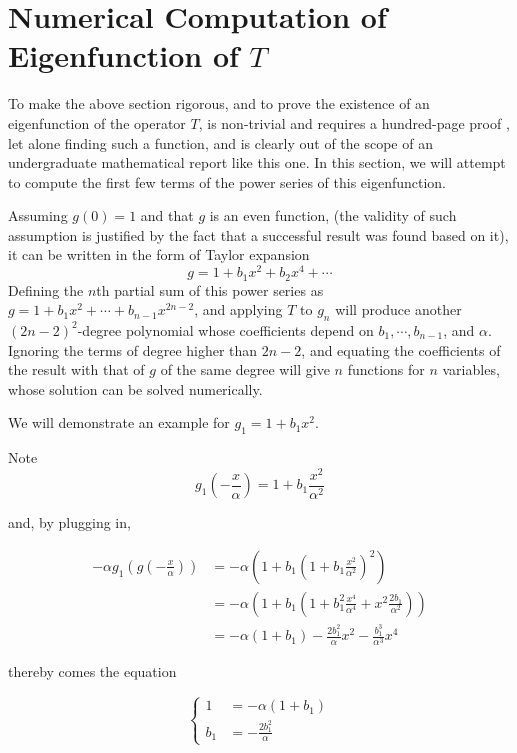 \section{Numerical Computation of Eigenfunction of $T$}

To make the above section rigorous, and to prove the existence of an eigenfunction of the operator $T$, is non-trivial and requires a hundred-page proof \cite{lyubich1999feigenbaum}, let alone finding such a function, and is clearly out of the scope of an undergraduate mathematical report like this one. 
In this section, we will attempt to compute the first few terms of the power series of this eigenfunction.

Assuming $g(0) = 1$ and that $g$ is an even function, (the validity of such assumption is justified by the fact that a successful result was found based on it), it can be written in the form of Taylor expansion 
$$
g = 1 + b_1 x^2 + b_2x^4 + \cdots 
$$
Defining the $n$th partial sum of this power series as $g = 1 + b_1x^2 + \cdots + b_{n-1}x^{2n-2}$, and applying $T$ to $g_n$ will produce another $(2n-2)^2$-degree polynomial whose coefficients depend on $b_1, \cdots, b_{n-1}$, and $\alpha$.
Ignoring the terms of degree higher than $2n-2$, and equating the coefficients of the result with that of $g$ of the same degree will give $n$ functions for $n$ variables, whose solution can be solved numerically. 

We will demonstrate an example for $g_1 = 1 + b_1 x^2$. 

Note 
$$
g_1\left(-\frac{x}{\alpha}\right) = 1 + b_1 \frac{x^2}{\alpha ^2}
$$

and, by plugging in,

\begin{align*}
-\alpha g_1\left(g\left(-\frac{x}{\alpha}\right)\right) 
&= -\alpha\left( 1 + b_1\left(1+b_1 \frac{x^2}{\alpha^2}\right)^2\right) \\
&= -\alpha\left(1 + b_1\left(1 + b_1^2\frac{x^4}{\alpha^4} + x^2 \frac{2b_1}{\alpha^2}\right)\right) \\
&= -\alpha (1 + b_1)  - \frac{2b_1^2}{\alpha} x^2 - \frac{b_1^3}{\alpha^3}x^4
\end{align*}

thereby comes the equation 

$$
\begin{cases}
    1 &= -\alpha(1+b_1) \\
    b_1 &= -\frac{2b_1^2}{\alpha} 
\end{cases}
$$

